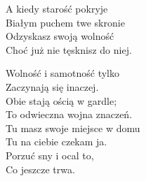 \begin{text}
A kiedy starość pokryje\\
Białym puchem twe skronie\\
Odzyskasz swoją wolność\\
Choć już nie tęsknisz do niej.

Wolność i samotność tylko\\
Zaczynają się inaczej.\\
Obie stają ością w gardle;\\
To odwieczna wojna znaczeń.\\
Tu masz swoje miejsce w domu\\
Tu na ciebie czekam ja.\\
Porzuć sny i ocal to,\\
Co jeszcze trwa.
\end{text}
